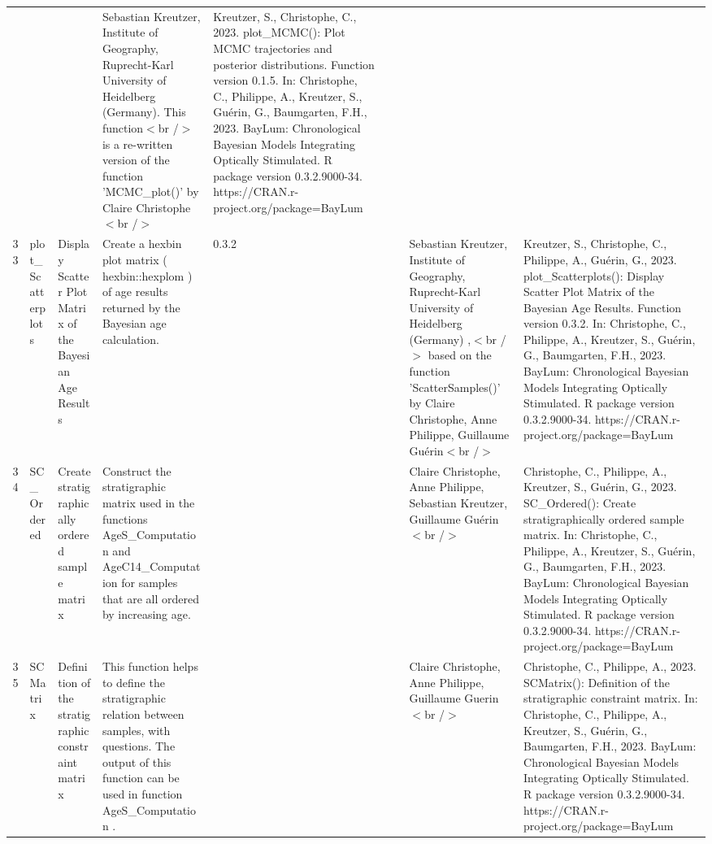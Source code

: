 \begin{table}[ht]
\begin{tabular}{rllllllll}
 &  &  & Sebastian Kreutzer, Institute of Geography, Ruprecht-Karl University of Heidelberg (Germany). This function$<$br /$>$ is a re-written version of the function 'MCMC\_plot()' by Claire Christophe$<$br /$>$ & Kreutzer, S., Christophe, C., 2023. plot\_MCMC(): Plot MCMC trajectories and posterior distributions. Function version 0.1.5. In: Christophe, C., Philippe, A., Kreutzer, S., Guérin, G., Baumgarten, F.H., 2023. BayLum: Chronological Bayesian Models Integrating Optically Stimulated. R package version 0.3.2.9000-34. https://CRAN.r-project.org/package=BayLum
 \\ 
  33 & plot\_Scatterplots & Display Scatter Plot Matrix of the Bayesian Age Results & Create a hexbin plot matrix ( hexbin::hexplom ) of age results returned by the Bayesian age calculation. & 0.3.2
 &  &  & Sebastian Kreutzer, Institute of Geography, Ruprecht-Karl University of Heidelberg (Germany) ,$<$br /$>$ based on the function 'ScatterSamples()' by Claire Christophe, Anne Philippe, Guillaume Guérin$<$br /$>$ & Kreutzer, S., Christophe, C., Philippe, A., Guérin, G., 2023. plot\_Scatterplots(): Display Scatter Plot Matrix of the Bayesian Age Results. Function version 0.3.2. In: Christophe, C., Philippe, A., Kreutzer, S., Guérin, G., Baumgarten, F.H., 2023. BayLum: Chronological Bayesian Models Integrating Optically Stimulated. R package version 0.3.2.9000-34. https://CRAN.r-project.org/package=BayLum
 \\ 
  34 & SC\_Ordered & Create stratigraphically ordered sample matrix & Construct the stratigraphic matrix used in the functions  AgeS\_Computation  and  AgeC14\_Computation  for samples that are all ordered by increasing age. &  &  &  & Claire Christophe, Anne Philippe, Sebastian Kreutzer, Guillaume Guérin$<$br /$>$ & Christophe, C., Philippe, A., Kreutzer, S., Guérin, G., 2023. SC\_Ordered(): Create stratigraphically ordered sample matrix. In: Christophe, C., Philippe, A., Kreutzer, S., Guérin, G., Baumgarten, F.H., 2023. BayLum: Chronological Bayesian Models Integrating Optically Stimulated. R package version 0.3.2.9000-34. https://CRAN.r-project.org/package=BayLum
 \\ 
  35 & SCMatrix & Definition of the stratigraphic constraint matrix & This function helps to define the stratigraphic relation between samples, with questions. The output of this function can be used in function  AgeS\_Computation . &  &  &  & Claire Christophe, Anne Philippe, Guillaume Guerin$<$br /$>$ & Christophe, C., Philippe, A., 2023. SCMatrix(): Definition of the stratigraphic constraint matrix. In: Christophe, C., Philippe, A., Kreutzer, S., Guérin, G., Baumgarten, F.H., 2023. BayLum: Chronological Bayesian Models Integrating Optically Stimulated. R package version 0.3.2.9000-34. https://CRAN.r-project.org/package=BayLum

\end{tabular}
\end{table}
